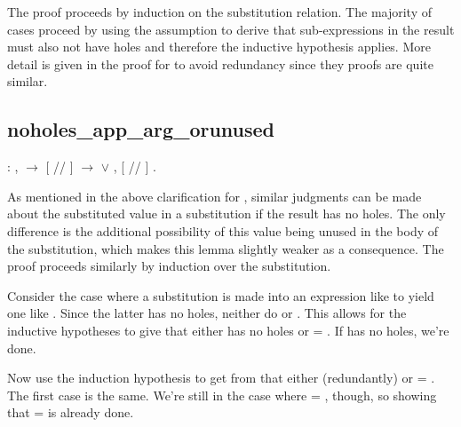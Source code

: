 \documentclass[12pt]{report}
\begin{document}
The proof proceeds by induction on the substitution relation. The
majority of cases proceed by using the  assumption to derive
that sub-expressions in the result must also not have holes and
therefore the inductive hypothesis applies. More detail is given in
the proof for  to avoid redundancy since
they proofs are quite similar. 

\subsection{noholes\_app\_arg\_orunused}

\begin{coqdoccode}
\coqdocemptyline
\coqdocindent{1.00em}
  : \coqdockw{\ensuremath{\forall}}    ,\coqdoceol
\coqdocindent{1.00em}
  \ensuremath{\rightarrow}\coqdoceol
\coqdocindent{1.00em}
[ // ]    \ensuremath{\rightarrow}\coqdoceol
\coqdocindent{1.00em}
  \ensuremath{\lor} \coqdockw{\ensuremath{\forall}} , [ // ]   .\coqdoceol
\coqdocemptyline
\end{coqdoccode}
As mentioned in the above clarification for ,
similar judgments can be made about the substituted value in
a substitution if the result has no holes. The only difference is the
additional possibility of this value being unused in the body of the
substitution, which makes this lemma slightly weaker as
a consequence. The proof proceeds similarly by induction over the
substitution. 

 Consider the case where a substitution is made into an expression
like    to yield one like   . Since the
latter has no holes, neither do  or . This allows for
the inductive hypotheses to give that either  has no holes or
 = . If  has no holes, we're done.


Now use the induction hypothesis to get from   that
either (redundantly)   or  = . The first case is
the same. We're still in the case where  = , though, so
showing that    =    is already done.
\end{document}
